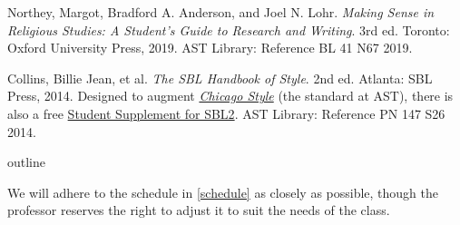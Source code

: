 \documentclass[titlepage]{article}
\begin{document}
\begingroup
\renewcommand{\section}[2]{}%
\begin{thebibliography}{Making}%

	 Northey, Margot, Bradford A. Anderson, and Joel N. Lohr.
	\emph{Making Sense in Religious Studies: A Student's Guide to Research and Writing}.
	3rd ed. Toronto: Oxford University Press, 2019. AST Library: Reference BL 41 N67 2019.

	 Collins, Billie Jean, et al.
	\emph{The SBL Handbook of Style}.
	2nd ed. Atlanta: SBL Press, 2014.
	Designed to augment \href{https://proxy.openathens.net/login?qurl=https%3A%2F%2Fwww.chicagomanualofstyle.org%2Fbook%2Fed17%2Ffrontmatter%2Ftoc.html}{\emph{Chicago Style}}
	(the standard at AST), there is also a free
	\href{https://www.sbl-site.org/assets/pdfs/pubs/SBLHSsupp2015-02.pdf}{Student Supplement for SBL2}. AST Library: Reference PN 147 S26 2014.

\end{thebibliography}
\endgroup

\section{Course Outline}
\label{outline}

We will adhere to the schedule in \autoref{schedule} as closely as
possible, though the professor reserves the right to adjust it to suit
the needs of the class.
\end{document}

